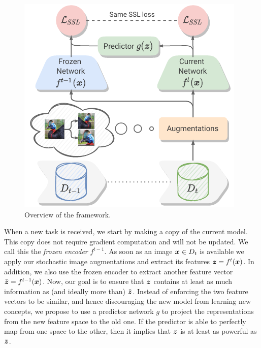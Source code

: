 \begin{figure}[t]
\centering
\includegraphics[width=0.85\columnwidth]{figures/name_of_method.pdf}
\vspace{-8pt}
\caption{Overview of the \name{} framework.}
\label{fig:\name{}}
\vspace{-11pt}
\end{figure}

When a new task is received, we start by making a copy of the current model. This copy does not require gradient computation and will not be updated. We call this the \textit{frozen encoder} $f^{t-1}$. As soon as an image $\boldsymbol{x} \in D_t$ is available we apply our stochastic image augmentations and extract its features $\boldsymbol{z} = f^t(\boldsymbol{x})$. In addition, we also use the frozen encoder to extract another feature vector $\bar{\boldsymbol{z}} = f^{t-1}(\boldsymbol{x})$. Now, our goal is to ensure that $\boldsymbol{z}$ contains at least as much information as (and ideally more than) $\bar{\boldsymbol{z}}$. Instead of enforcing the two feature vectors to be similar, and hence discouraging the new model from learning new concepts, we propose 
to use a predictor network $g$ to project the representations from the new feature space to the old one. If the predictor is able to perfectly map from one space to the other, then it implies that $\boldsymbol{z}$ is at least as powerful as $\bar{\boldsymbol{z}}$.

